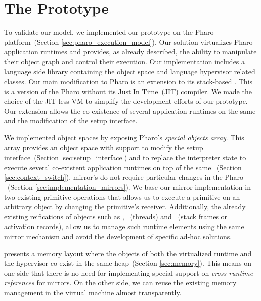 
\chapter{The \Vtt Prototype}
\minitoc
{}
\introduction

To validate our model, we implemented our \Vtt prototype on the Pharo platform~(Section \ref{sec:pharo_execution_model}). Our solution virtualizes Pharo application runtimes and provides, as already described, the ability to manipulate their object graph and control their execution. Our implementation includes a language side library containing the object space and language hypervisor related classes. Our main modification to Pharo is an extension to its stack-based \VM. This \VM is a version of the Pharo \VM without its Just In Time~(JIT) compiler. We made the choice of the JIT-less VM to simplify the development efforts of our prototype. Our extension allows the co-existence of several application runtimes on the same \VM and the modification of the \VM setup interface.

We implemented object spaces by exposing Pharo's \emph{special objects array}. This array provides an object space with support to modify the \VM setup interface~(Section \ref{sec:setup_interface}) and to replace the \VM interpreter state to execute several co-existent application runtimes on top of the same \VM~(Section \ref{sec:context_switch}). \Vtt mirror's do not require particular changes in the Pharo \VM~(Section \ref{sec:implementation_mirrors}). We base our mirror implementation in two existing \VM primitive operations that allows us to execute a primitive on an arbitrary object by changing the primitive's receiver. Additionally, the already existing reifications of objects such as , ~(threads) and ~(stack frames or activation records), allow us to manage such runtime elements using the same mirror mechanism and avoid the development of specific ad-hoc solutions.

\Vtt presents a memory layout where the objects of both the virtualized runtime and the hypervisor co-exist in the same heap~(Section \ref{sec:memory}). This means on one side that there is no need for implementing special support on \emph{cross-runtime references} for mirrors. On the other side, we can reuse the existing memory management in the virtual machine almost transparently.

